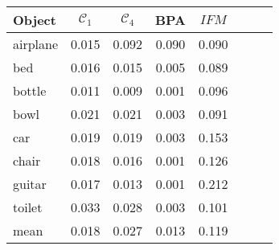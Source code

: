 \begin{center}
     \label{tab:distance7500} 
    \begin{tabular}{| l  | c | c | c | c | c | c | c |}
        \hline
        Object& $\mathcal{C}_1$ & $\mathcal{C}_4$ & BPA & $IFM$  \\ \hline
        airplane&0.015&0.092&0.090&0.090\\\hline
        bed&0.016&0.015&0.005&0.089\\\hline
        bottle&0.011&0.009&0.001&0.096\\\hline
        bowl&0.021&0.021&0.003&0.091\\\hline
        car&0.019&0.019&0.003&0.153\\\hline
        chair&0.018&0.016&0.001&0.126\\\hline
        guitar&0.017&0.013&0.001&0.212\\\hline
        toilet&0.033&0.028&0.003&0.101\\\hline\hline
        mean&0.018&0.027&0.013&0.119\\\hline
    \end{tabular}
\end{center}

